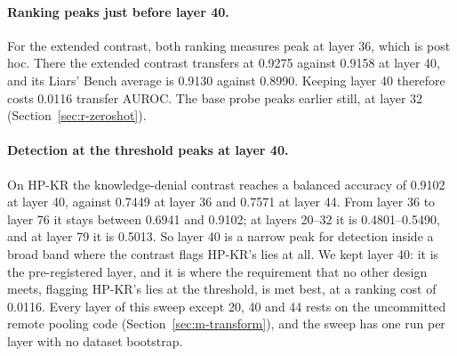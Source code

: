 \paragraph{Ranking peaks just before layer 40.}
For the extended contrast, both ranking measures peak at layer 36, which is post hoc. %
There the extended contrast transfers at 0.9275 against 0.9158 at layer 40, and its Liars' Bench average is 0.9130 against 0.8990. %
Keeping layer 40 therefore costs 0.0116 transfer AUROC. %
The base probe peaks earlier still, at layer 32 (Section~\ref{sec:r-zeroshot}). %

\paragraph{Detection at the threshold peaks at layer 40.}
On HP-KR the knowledge-denial contrast reaches a balanced accuracy of 0.9102 at layer 40, against 0.7449 at layer 36 and 0.7571 at layer 44. %
From layer 36 to layer 76 it stays between 0.6941 and 0.9102; at layers 20--32 it is 0.4801--0.5490, and at layer 79 it is 0.5013. %
So layer 40 is a narrow peak for detection inside a broad band where the contrast flags HP-KR's lies at all. %
We kept layer 40: it is the pre-registered layer, and it is where the requirement that no other design meets, flagging HP-KR's lies at the threshold, is met best, at a ranking cost of 0.0116. %
Every layer of this sweep except 20, 40 and 44 rests on the uncommitted remote pooling code (Section~\ref{sec:m-transform}), and the sweep has one run per layer with no dataset bootstrap. %

